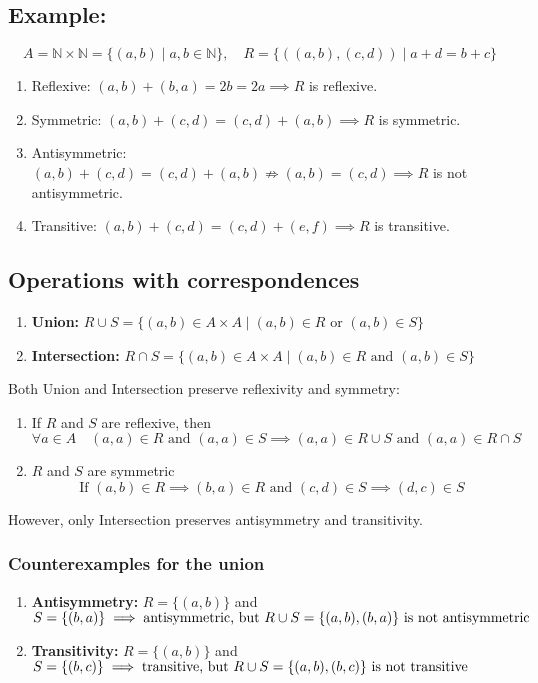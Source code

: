 \documentclass[11pt]{article}
\begin{document}
\subsection*{Example:}
\[
A = \mathbb{N} \times \mathbb{N} = \{(a,b) \mid a,b \in \mathbb{N}\}, \quad R = \{\left((a,b), (c,d)\right) \mid a + d = b + c\}
\]
\begin{enumerate}
    \item Reflexive: $(a,b) + (b,a) = 2b = 2a \implies R$ is reflexive.
    \item Symmetric: $(a,b) + (c,d) = (c,d) + (a,b) \implies R$ is symmetric.
    \item Antisymmetric: $(a,b) + (c,d) = (c,d) + (a,b) \nRightarrow (a,b) = (c,d) \implies R$ is not antisymmetric.
    \item Transitive: $(a,b) + (c,d) = (c,d) + (e,f) \implies R$ is transitive.
\end{enumerate}

\subsection{Operations with correspondences}
\begin{enumerate}
    \item \textbf{Union:} $R \cup S = \{(a,b) \in A \times A \mid (a,b) \in R \text{ or } (a,b) \in S\}$
    \item \textbf{Intersection:} $R \cap S = \{(a,b) \in A \times A \mid (a,b) \in R \text{ and } (a,b) \in S\}$
\end{enumerate}

Both Union and Intersection preserve reflexivity and symmetry:
\begin{enumerate}
    \item If $R$ and $S$ are reflexive, then 
    \[
    \forall a \in A \quad (a,a) \in R \text{ and } (a,a) \in S \implies (a,a) \in R \cup S \text{ and } (a,a) \in R \cap S
    \]
    \item $R$ and $S$ are symmetric
    \[
    \text{If } (a,b) \in R \implies (b,a) \in R \text{ and } (c,d) \in S \implies (d,c) \in S 
    \]
\end{enumerate}

However, only Intersection preserves antisymmetry and transitivity.

\subsubsection{Counterexamples for the union}
\begin{enumerate}
    \item \textbf{Antisymmetry:} $R = \{(a,b)\}$ and $S = \{(b,a)\} \implies \text{antisymmetric, but }\\
    R \cup S = \{(a,b), (b,a)\} \text{ is not antisymmetric}$
    \item \textbf{Transitivity:} $R = \{(a,b)\}$ and $S = \{(b,c)\} \implies \text{transitive, but }\\
    R \cup S = \{(a,b), (b,c)\} \text{ is not transitive}$
\end{enumerate}
\end{document}
